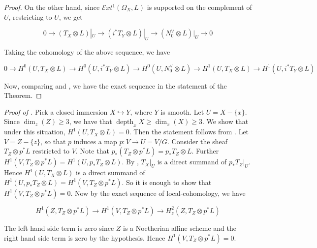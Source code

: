 \documentclass[12pt,twoside,]{amsart}
\theoremstyle{plain}
\theoremstyle{definition}
\begin{document}
\begin{proof}
On the other hand, since $\mathcal{E}xt^1(\Omega_X, L)$ is supported on the complement of $U$, restricting to $U$, we get

\begin{equation}\label{exact sequence of duals restrcited to U}
   0 \to (T_X \otimes L)|_U \to (i^*T_Y\otimes L)|_U \to (N_0^{\vee} \otimes L)|_U \to 0 
\end{equation}   

Taking the cohomology of the above sequence, we have

\begin{equation}\label{global sections of exact sequence of duals restricted to U}
    0 \to H^0(U, T_X \otimes L) \to H^0(U, i^*T_Y\otimes L) \to H^0(U, N_0^{\vee} \otimes L) \to H^1(U, T_X \otimes L) \to H^1(U, i^*T_Y\otimes L)
\end{equation}

Now, comparing  and , we have the exact sequence in the statement of the Theorem.

\end{proof}

\noindent\textit{Proof of .} Pick a closed immersion $X \hookrightarrow Y$, where $Y$ is smooth. Let $U = X -\{x\}$. Since $\operatorname{dim}_z(Z) \geq 3$, we have that $\operatorname{depth}_xX \geq \operatorname{dim}_x(X)  \geq 3$. We show that under this situation, $H^1(U, T_X \otimes L) = 0$. Then the statement follows from . Let $V = Z-\{z\}$, so that $p$ induces a map $p: V \to U = V/G$. Consider the sheaf $T_Z \otimes p^*L$ restricted to $V$. Note that $p_*(T_Z \otimes p^*L) = p_*T_Z \otimes L$. Further $H^1(V,T_Z \otimes p^*L) = H^1(U, p_*T_Z \otimes L)$. By \cite[Corollary $3.1.23$ (see also Proposition $3.1.22$)]{sernesi2006deformations}, $T_X|_U$ is a direct summand of $p_*T_Z|_U$. Hence $H^1(U, T_X \otimes L)$ is a direct summand of $H^1(U, p_*T_Z \otimes L) = H^1(V,T_Z \otimes p^*L)$. So it is enough to show that $H^1(V,T_Z \otimes p^*L) = 0$. Now by the exact sequence of local-cohomology, we have 

\begin{equation}\label{local cohomology}
  H^1(Z, T_Z \otimes p^*L) \to H^1(V,T_Z \otimes p^*L) \to H_z^2(Z, T_Z \otimes p^*L)  
\end{equation}

The left hand side term is zero since $Z$ is a Noetherian affine scheme and the right hand side term is zero by the hypothesis. Hence $H^1(V,T_Z \otimes p^*L) = 0$.
\end{document}
